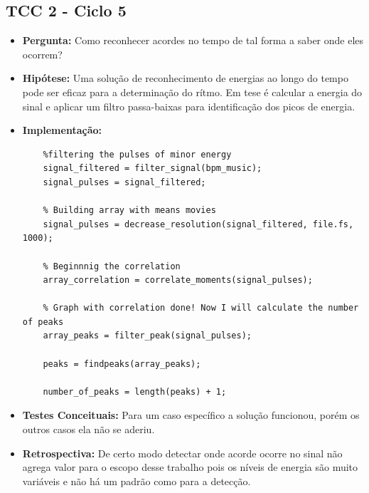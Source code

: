 \subsection{TCC 2 - Ciclo 5}
\begin{itemize}
\item \textbf{Pergunta:} Como reconhecer acordes no tempo de tal forma a saber onde eles ocorrem?
\item \textbf{Hipótese:} Uma solução de reconhecimento de energias ao longo do tempo pode ser eficaz para a determinação do rítmo. Em tese é calcular a energia do sinal e aplicar um filtro passa-baixas para identificação dos picos de energia.
\item \textbf{Implementação:} 
\begin{lstlisting}
    %filtering the pulses of minor energy
    signal_filtered = filter_signal(bpm_music);
    signal_pulses = signal_filtered;

    % Building array with means movies
    signal_pulses = decrease_resolution(signal_filtered, file.fs, 1000);

    % Beginnnig the correlation
    array_correlation = correlate_moments(signal_pulses);

    % Graph with correlation done! Now I will calculate the number of peaks
    array_peaks = filter_peak(signal_pulses);

    peaks = findpeaks(array_peaks);

    number_of_peaks = length(peaks) + 1;

\end{lstlisting}
\item \textbf{Testes Conceituais:} Para um caso específico a solução funcionou, porém os outros casos ela não se aderiu.    
\item \textbf{Retrospectiva:} De certo modo detectar onde acorde ocorre no sinal não agrega valor para o escopo desse trabalho pois os níveis de energia são muito variáveis e não há um padrão como para a detecção.
\end{itemize} 

